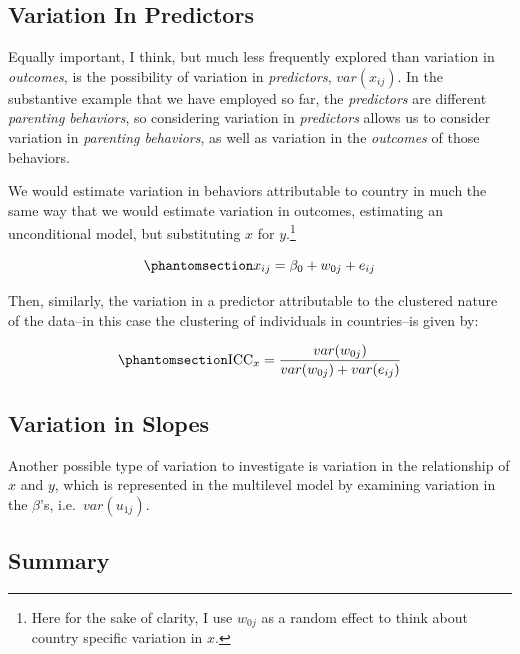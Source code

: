 \documentclass[
  letterpaper,
  DIV=11,
  numbers=noendperiod]{scrreprt}
\begin{document}
\subsection{Variation In Predictors}\label{variation-in-predictors}

Equally important, I think, but much less frequently explored than
variation in \emph{outcomes}, is the possibility of variation in
\emph{predictors}, \(var(x_{ij})\). In the substantive example that we
have employed so far, the \emph{predictors} are different
\emph{parenting behaviors}, so considering variation in
\emph{predictors} allows us to consider variation in \emph{parenting
behaviors}, as well as variation in the \emph{outcomes} of those
behaviors. 

We would estimate variation in behaviors attributable to country in much
the same way that we would estimate variation in outcomes, estimating an
unconditional model, but substituting \(x\) for \(y\).\footnote{Here for
  the sake of clarity, I use \(w_{0j}\) as a random effect to think
  about country specific variation in \(x\).}

\begin{equation}\phantomsection\label{eq-unconditionalx}{x_{ij} = \beta_0 + w_{0j} + e_{ij}}\end{equation}

Then, similarly, the variation in a predictor attributable to the
clustered nature of the data--in this case the clustering of individuals
in countries--is given by:

\begin{equation}\phantomsection\label{eq-ICCx}{\text{ICC}_x = \frac{var(w_{0j})}{var(w_{0j}) + var(e_{ij})}}\end{equation}

\subsection{Variation in Slopes}\label{variation-in-slopes}

Another possible type of variation to investigate is variation in the
relationship of \(x\) and \(y\), which is represented in the multilevel
model by examining variation in the \(\beta\)'s, i.e.~\(var(u_{1j})\).

\subsection{Summary}\label{summary}
\end{document}
